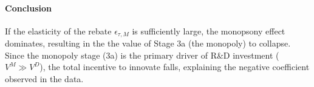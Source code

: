 \documentclass[12pt]{article}
\begin{document}
\paragraph{Conclusion}
If the elasticity of the rebate $\epsilon_{\tau, M}$ is sufficiently large, the monopsony effect dominates, resulting in the the value of Stage 3a (the monopoly) to collapse. Since the monopoly stage (3a) is the primary driver of R\&D investment ($V^M \gg V^D$), the total incentive to innovate falls, explaining the negative coefficient observed in the data.
\end{document}
